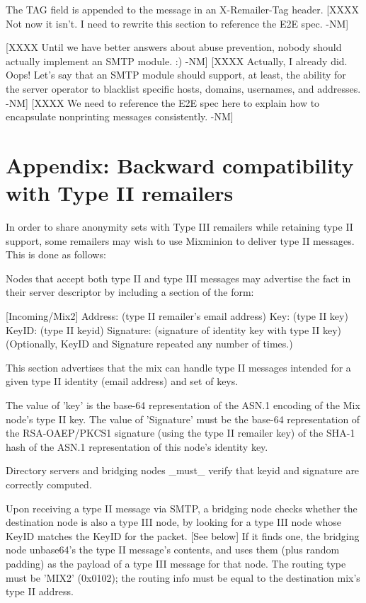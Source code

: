 The TAG field is appended to the message in an X-Remailer-Tag header.
[XXXX Not now it isn't.  I need to rewrite this section to reference
the E2E spec. -NM]

[XXXX Until we have better answers about abuse prevention, nobody should
  actually implement an SMTP module. :) -NM]
[XXXX Actually, I already did.  Oops!  Let's say that an SMTP module
  should support, at least, the ability for the server operator to
  blacklist specific hosts, domains, usernames, and addresses. -NM]
[XXXX We need to reference the E2E spec here to explain how to
  encapsulate nonprinting messages consistently. -NM]

\section{Appendix: Backward compatibility with Type II remailers}

In order to share anonymity sets with Type III remailers while
retaining type II support, some remailers may wish to use Mixminion to
deliver type II messages.  This is done as follows:

Nodes that accept both type II and type III messages may advertise the
fact in their server descriptor by including a section of the form:
 
         [Incoming/Mix2]
         Address: (type II remailer's email address)
         Key: (type II key)
	 KeyID: (type II keyid)
         Signature: (signature of identity key with type II key)
	 (Optionally, KeyID and Signature repeated any number of
                      times.)

This section advertises that the mix can handle type II messages
intended for a given type II identity (email address) and set of keys.

The value of 'key' is the base-64 representation of the ASN.1 encoding
of the Mix node's type II key. The value of 'Signature' must be the
base-64 representation of the RSA-OAEP/PKCS1 signature (using the
type II remailer key) of the SHA-1 hash of the ASN.1 representation of
this node's identity key.

Directory servers and bridging nodes _must_ verify that keyid and
signature are correctly computed.

Upon receiving a type II message via SMTP, a bridging node checks
whether the destination node is also a type III node, by looking for a
type III node whose KeyID matches the KeyID for the packet. [See below]
If it finds one, the bridging node unbase64's the type II message's 
contents, and uses them (plus random padding) as the payload
of a type III message for that node.  The routing type must be 'MIX2'
(0x0102); the routing info must be equal to the destination mix's
type II address.


